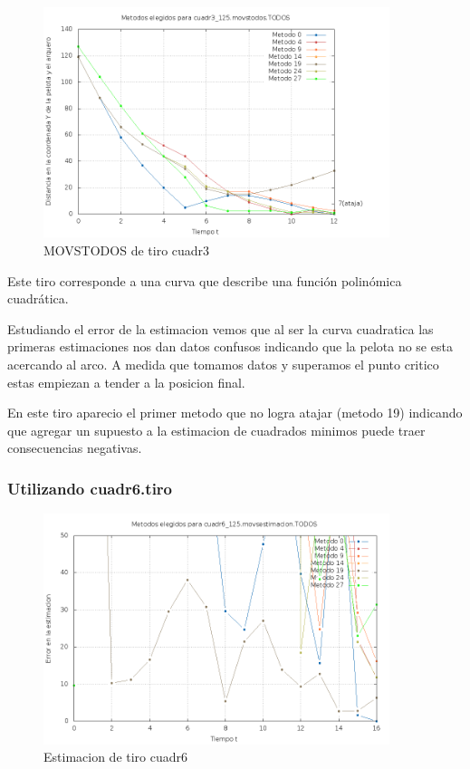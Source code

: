 \begin{figure}[H]
\begin{center}
\includegraphics[width=0.9\textwidth]{img/cuadr3_125_movstodos_TODOS_elegidos.png}
     \caption{MOVSTODOS de tiro cuadr3}
\end{center}
\end{figure}

Este tiro corresponde a una curva que describe una función polinómica cuadrática.

Estudiando el error de la estimacion vemos que al ser la curva cuadratica las primeras estimaciones
nos dan datos confusos indicando que la pelota no se esta acercando al arco. A medida que tomamos
datos y superamos el punto critico estas empiezan a tender a la posicion final.

En este tiro aparecio el primer metodo que no logra atajar (metodo 19) indicando que agregar un
supuesto a la estimacion de cuadrados minimos puede traer consecuencias negativas.




\subsubsection{Utilizando cuadr6.tiro}

\begin{figure}[H]
\begin{center}
\includegraphics[width=0.9\textwidth]{img/cuadr6_125_movsestimacion_TODOS_elegidos.png}
     \caption{Estimacion de tiro cuadr6}
\end{center}
\end{figure}

